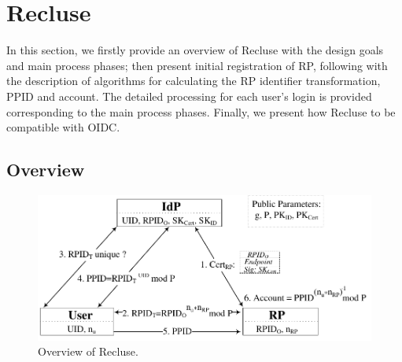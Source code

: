 \section{Recluse}
\label{sec:Recluse}
In this section, we firstly provide an overview of Recluse with the design goals and main process phases; then present initial registration of RP, following with the description of algorithms for calculating the RP identifier transformation, PPID and account. The detailed processing for each user's login is provided corresponding to the main process phases. Finally, we present how Recluse to be compatible with OIDC.

\subsection{Overview}
\label{subsec:overview}
\begin{figure}
  \centering
  \includegraphics[width=\linewidth]{fig/Overview.pdf}
  \caption{Overview of Recluse.}
  \label{fig:overview}
\end{figure}

